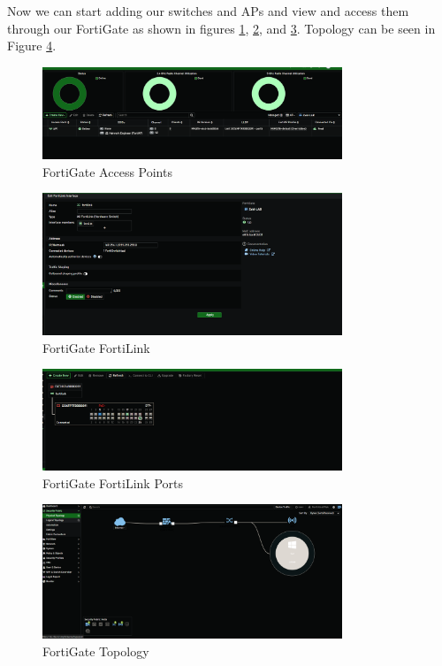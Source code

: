 \documentclass[12pt]{report}
\begin{document}
Now we can start adding our switches and APs and view and access them through our FortiGate as shown in figures \ref{fig:ap}, \ref{fig:fl}, and \ref{fig:flports1}. Topology can be seen in Figure \ref{fig:fltop}.
\begin{figure}
    \centering
    \includegraphics[width=0.8\textwidth]{images/Implementation/ap.png}
    \caption{FortiGate Access Points}
    \label{fig:ap}
\end{figure}
\begin{figure}
    \centering
    \includegraphics[width=0.8\textwidth]{images/Implementation/fl.png}
    \caption{FortiGate FortiLink}
    \label{fig:fl}
\end{figure}
\begin{figure}
    \centering
    \includegraphics[width=0.8\textwidth]{images/Implementation/flports1.png}
    \caption{FortiGate FortiLink Ports}
    \label{fig:flports1}
\end{figure}
\begin{figure}
    \centering
    \includegraphics[width=0.8\textwidth]{images/Implementation/fltop.png}
    \caption{FortiGate Topology}
    \label{fig:fltop}
\end{figure}
\end{document}
